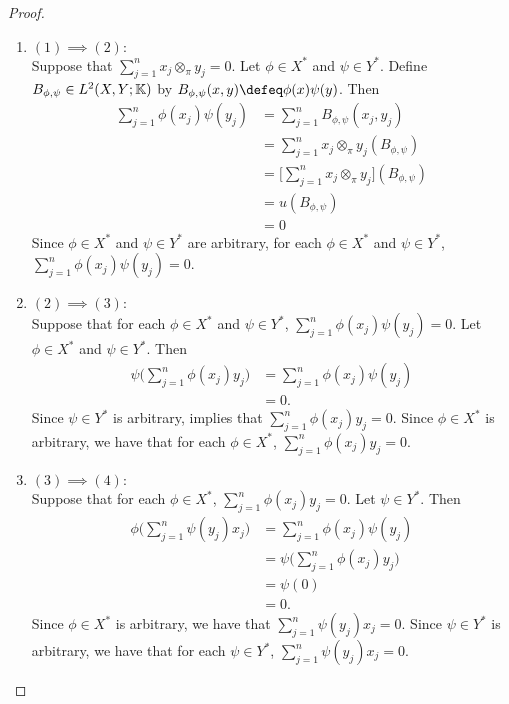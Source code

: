 \documentclass{book}
\begin{document}
\begin{proof}\
	\begin{enumerate}
		\item $(1) \implies (2):$ \\
		Suppose that $\sum\limits_{j=1}^n x_j \otimes_{\pi} y_j = 0$. Let $\phi \in X^*$ and $\psi \in Y^*$. Define $B_{\phi, \psi} \in L^2(X,Y;\mathbb{K})$ by $B_{\phi, \psi}(x,y) \defeq \phi(x)\psi(y)$. Then 
		\begin{align*}
			\sum\limits_{j=1}^n  \phi(x_j) \psi(y_j)
			& = \sum\limits_{j=1}^n  B_{\phi, \psi}(x_j,y_j) \\
			& = \sum\limits_{j=1}^n  x_j \otimes_{\pi} y_j(B_{\phi, \psi}) \\
			& = \bigg[ \sum\limits_{j=1}^n   x_j \otimes_{\pi} y_j \bigg] (B_{\phi, \psi}) \\
			& = u(B_{\phi, \psi}) \\
			& = 0
		\end{align*}
		Since $\phi \in X^*$ and $\psi \in Y^*$ are arbitrary, for each $\phi \in X^*$ and $\psi \in Y^*$, $\sum\limits_{j=1}^n  \phi(x_j) \psi(y_j) = 0$. 
		\item $(2) \implies (3):$ \\
		Suppose that for each $\phi \in X^*$ and $\psi \in Y^*$, $\sum\limits_{j=1}^n  \phi(x_j) \psi(y_j) = 0$. Let $\phi \in X^*$ and $\psi \in Y^*$. Then  
		\begin{align*}
			\psi \bigg( \sum\limits_{j=1}^n  \phi(x_j)  y_j \bigg)
			& = \sum\limits_{j=1}^n  \phi(x_j) \psi(y_j) \\
			& = 0.
		\end{align*}
		Since $\psi \in Y^*$ is arbitrary,  implies that $\sum\limits_{j=1}^n  \phi(x_j)  y_j = 0$. Since $\phi \in X^*$ is arbitrary, we have that for each $\phi \in X^*$, $\sum\limits_{j=1}^n  \phi(x_j)  y_j = 0$.
		\item $(3) \implies (4)$: \\
		Suppose that for each $\phi \in X^*$, $\sum\limits_{j=1}^n  \phi(x_j)  y_j = 0$. Let $\psi \in Y^*$. Then 
		\begin{align*}
			\phi \bigg( \sum\limits_{j=1}^n  \psi(y_j)  x_j \bigg)
			& = \sum\limits_{j=1}^n  \phi(x_j) \psi(y_j) \\
			& = \psi \bigg( \sum\limits_{j=1}^n  \phi(x_j)  y_j \bigg) \\
			& = \psi(0) \\
			& = 0.
		\end{align*}
		Since $\phi \in X^*$ is arbitrary, we have that $\sum\limits_{j=1}^n  \psi(y_j)  x_j = 0$. Since $\psi \in Y^*$ is arbitrary, we have that for each $\psi \in Y^*$, $\sum\limits_{j=1}^n  \psi(y_j) x_j = 0$.

\end{enumerate}
\end{proof}
\end{document}
